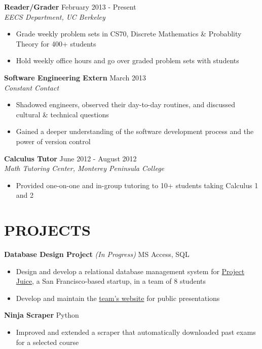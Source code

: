 \documentclass[margin]{res}
\begin{document}
\begin{resume}
\textbf{Reader/Grader} \hfill February 2013 - Present\\
\textit{EECS Department, UC Berkeley} \smallskip
\begin{itemize}[leftmargin=10pt]
\item Grade weekly problem sets in CS70, Discrete Mathematics \& Probablity Theory for 400+ students
\item Hold weekly office hours and go over graded problem sets with students
\end{itemize}

\textbf{Software Engineering Extern} \hfill March 2013 \\
\textit{Constant Contact} \smallskip
\begin{itemize}[leftmargin=10pt]
\item Shadowed engineers, observed their day-to-day routines, and discussed cultural \& technical questions
\item Gained a deeper understanding of the software development process and the power of version control  
\end{itemize}

\textbf{Calculus Tutor} \hfill June 2012 - August 2012 \\
\textit{Math Tutoring Center, Monterey Peninsula College} \smallskip
\begin{itemize}[leftmargin=10pt]
\item Provided one-on-one and in-group tutoring to 10+ students taking Calculus 1 and 2
\end{itemize}

\section{PROJECTS} 
\textbf{Database Design Project} \textit{(In Progress)} \hfill MS Access, SQL
\begin{itemize}[leftmargin=10pt]
\itemsep -2pt %
\item Design and develop a relational database management system for \href{http://www.projectjuice.com/}{Project Juice}, a San Francisco-based startup, in a team of 8 students
\item Develop and maintain the \href{http://www.ocf.berkeley.edu/~kqdtran/ieor115/proposal}{team's website} for public presentations
\end{itemize}

\textbf{Ninja Scraper} \hfill Python
\begin{itemize}[leftmargin=10pt]
\itemsep -2pt %
\item Improved and extended a scraper that automatically downloaded past exams for a selected course
\end{itemize}


\end{resume}
\end{document}
